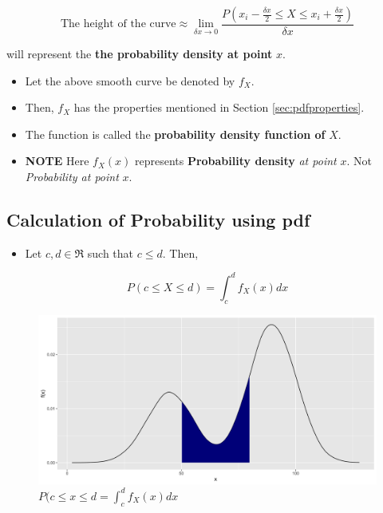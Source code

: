 \documentclass[]{book}
\providecommand{\tightlist}{%
  \setlength{\itemsep}{0pt}\setlength{\parskip}{0pt}}
\begin{document}
\[\text{The height of the curve} \approx \lim \limits_{\delta x \to 0} \frac{P(x_i-\frac{\delta x}{2} \leq X \leq x_i+\frac{\delta x}{2})}{\delta x} \]

will represent the \textbf{the probability density at point} \(x\).

\begin{itemize}
\item
  Let the above smooth curve be denoted by \(f_X\).
\item
  Then, \(f_X\) has the properties mentioned in Section \ref{sec:pdfproperties}.
\item
  The function is called the \textbf{probability density function of}
  \(X\).
\item
  \textbf{NOTE} Here \(f_X(x)\) represents \textbf{Probability density} \emph{at point} \(x\). Not \emph{Probability at point} \(x\).
\end{itemize}

\hypertarget{calculation-of-probability-using-pdf}{%
\subsection{Calculation of Probability using pdf}\label{calculation-of-probability-using-pdf}}

\begin{itemize}
\tightlist
\item
  Let \(c,d \in \Re\) such that \(c\leq d\). Then,
\end{itemize}

\[P(c\leq X \leq d) = \int_c^d f_X(x)dx\]

\begin{figure}

{\centering \includegraphics{figure/hist2-1} 

}

\caption{$P(c\leq x \leq d = \int_c^d f_X(x)dx$}\label{fig:hist2}
\end{figure}
\end{document}
